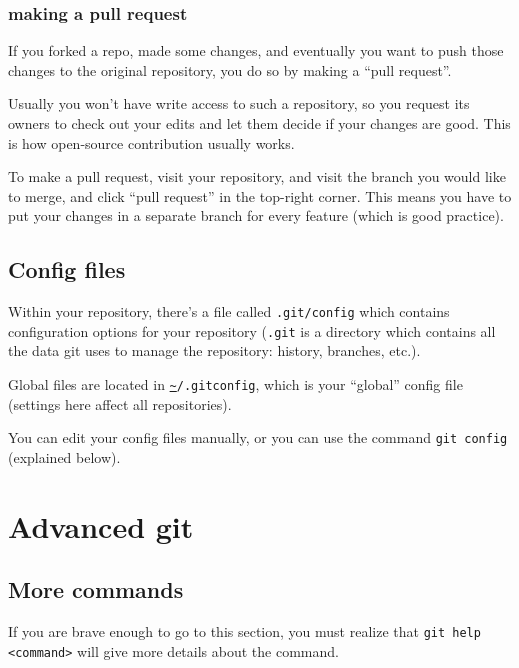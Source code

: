 \documentclass[12pt]{article}
\newcommand{\urlwofont}[1]{\urlstyle{same}\url{#1}}
\begin{document}
\subsubsection{making a pull request}
If you forked a repo, made some changes, and eventually you want to push those changes to the original repository, you do so by making a ``pull request''.

Usually you won't have write access to such a repository, so you request its owners to check out your edits and let them decide if your changes are good. This is how open-source contribution usually works.

To make a pull request, visit your repository, and visit the branch you would like to merge, and click ``pull request'' in the top-right corner. This means you have to put your changes in a separate branch for every feature (which is good practice).

\subsection{Config files}
Within your repository, there's a file called \texttt{.git/config} which contains configuration options for your repository (\texttt{.git} is a directory which contains all the data git uses to manage the repository: history, branches, etc.).

Global files are located in \texttt{\urlwofont{~}/.gitconfig}, which is your ``global'' config file (settings here affect all repositories).

You can edit your config files manually, or you can use the command \texttt{git config} (explained below).

\section{Advanced git}

\subsection{More commands}
If you are brave enough to go to this section, you must realize that \texttt{git help <command>} will give more details about the command.
\end{document}
